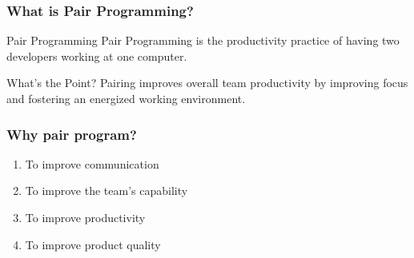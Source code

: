 \begin{frame}
  \frametitle{What is Pair Programming?}
  \begin{block}{Pair Programming}
  Pair Programming is the productivity practice of having two developers working at one computer.
  \end{block}
  \begin{block}{What's the Point?}
  Pairing improves overall team productivity by improving focus and fostering an energized working environment.\cite{6227110} 
  \end{block}
\end{frame}

\begin{frame}
  \frametitle{Why pair program?}
  \begin{enumerate}
  \item To improve communication 
  \item To improve the team's capability
  \item To improve productivity
  \item To improve product quality
  \end{enumerate}
\end{frame}

